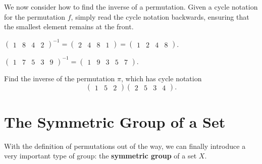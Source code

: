 We now consider how to find the inverse of a permutation. Given a cycle notation for the permutation $f$, simply read the cycle notation backwards, ensuring that the smallest element remains at the front.

\begin{example}
    $\begin{pmatrix}1 & 8 & 4 & 2\end{pmatrix}^{-1} = \begin{pmatrix}2 & 4 & 8 & 1\end{pmatrix} = \begin{pmatrix}1 & 2 & 4 & 8\end{pmatrix}$.
\end{example}

\begin{example}
    $\begin{pmatrix}1 & 7 & 5 & 3 & 9\end{pmatrix}^{-1} = \begin{pmatrix}1 & 9 & 3 & 5 & 7\end{pmatrix}$.
\end{example}

\begin{exercise}
    Find the inverse of the permutation $\pi$, which has cycle notation
    \[
        \begin{pmatrix}1 & 5 & 2\end{pmatrix}\begin{pmatrix}2 & 5 & 3 & 4\end{pmatrix}.
    \]
\end{exercise}

\section{The Symmetric Group of a Set}
With the definition of permutations out of the way, we can finally introduce a very important type of group: the \textbf{symmetric group} of a set $X$.

